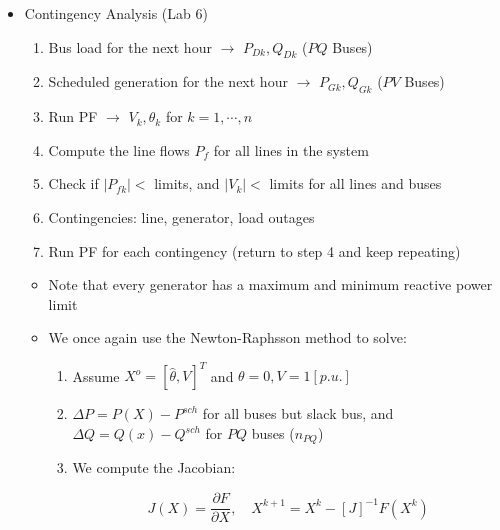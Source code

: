 \begin{itemize}

  \item Contingency Analysis (Lab 6)

    \begin{enumerate}

      \item Bus load for the next hour $\to$ $P_{Dk},Q_{Dk}$ ($PQ$ Buses)

      \item Scheduled generation for the next hour $\to$ $P_{Gk},Q_{Gk}$ ($PV$ Buses)

      \item Run PF $\to$ $V_k,\theta_k$ for $k=1,\cdots,n$

      \item Compute the line flows $P_f$ for all lines in the system

      \item Check if $|P_{fk}|<$ limits, and $|V_{k}|<$ limits for all lines and buses

      \item Contingencies: line, generator, load outages

      \item Run PF for each contingency (return to step 4 and keep repeating)

    \end{enumerate}

    \begin{itemize}

      \item Note that every generator has a maximum and minimum reactive power limit

      \item We once again use the Newton-Raphsson method to solve:

        \begin{enumerate}

          \item Assume $X^o=[\hat{\theta},V]^T$ and $\theta=0,V=1[p.u.]$

          \item $\Delta P=P(X)-P^{sch}$ for all buses but slack bus, and $\Delta Q=Q(x)-Q^{sch}$ for $PQ$ buses ($n_{PQ}$)

          \item We compute the Jacobian:

            $$J(X)=\frac{\partial F}{\partial X},\quad X^{k+1}=X^k-[J]^{-1}F(X^k)$$


\end{enumerate}
\end{itemize}
\end{itemize}
